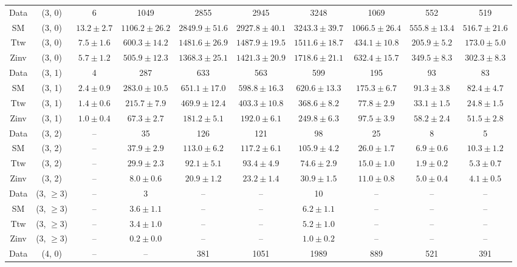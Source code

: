 \begin{table}[h!]
{\begin{tabular}{cccccccccc}
	Data & (3, 0) & 6 & 1049 & 2855 & 2945 & 3248 & 1069 & 552 & 519 \\[0.5ex] 
	SM & (3, 0) & $13.2\pm 2.7$ & $1106.2\pm 26.2$ & $2849.9\pm 51.6$ & $2927.8\pm 40.1$ & $3243.3\pm 39.7$ & $1066.5\pm 26.4$ & $555.8\pm 13.4$ & $516.7\pm 21.6$ \\[0.5ex] 
	Ttw & (3, 0) & $7.5\pm 1.6$ & $600.3\pm 14.2$ & $1481.6\pm 26.9$ & $1487.9\pm 19.5$ & $1511.6\pm 18.7$ & $434.1\pm 10.8$ & $205.9\pm 5.2$ & $173.0\pm 5.0$ \\[0.5ex] 
	Zinv & (3, 0) & $5.7\pm 1.2$ & $505.9\pm 12.3$ & $1368.3\pm 25.1$ & $1421.3\pm 20.9$ & $1718.6\pm 21.1$ & $632.4\pm 15.7$ & $349.5\pm 8.3$ & $302.3\pm 8.3$ \\[0.5ex] 
	Data & (3, 1) & 4 & 287 & 633 & 563 & 599 & 195 & 93 & 83 \\[0.5ex] 
	SM & (3, 1) & $2.4\pm 0.9$ & $283.0\pm 10.5$ & $651.1\pm 17.0$ & $598.8\pm 16.3$ & $620.6\pm 13.3$ & $175.3\pm 6.7$ & $91.3\pm 3.8$ & $82.4\pm 4.7$ \\[0.5ex] 
	Ttw & (3, 1) & $1.4\pm 0.6$ & $215.7\pm 7.9$ & $469.9\pm 12.4$ & $403.3\pm 10.8$ & $368.6\pm 8.2$ & $77.8\pm 2.9$ & $33.1\pm 1.5$ & $24.8\pm 1.5$ \\[0.5ex] 
	Zinv & (3, 1) & $1.0\pm 0.4$ & $67.3\pm 2.7$ & $181.2\pm 5.1$ & $192.0\pm 6.1$ & $249.8\pm 6.3$ & $97.5\pm 3.9$ & $58.2\pm 2.4$ & $51.5\pm 2.8$ \\[0.5ex] 
	Data & (3, 2) & -- & 35 & 126 & 121 & 98 & 25 & 8 & 5 \\[0.5ex] 
	SM & (3, 2) & -- & $37.9\pm 2.9$ & $113.0\pm 6.2$ & $117.2\pm 6.1$ & $105.9\pm 4.2$ & $26.0\pm 1.7$ & $6.9\pm 0.6$ & $10.3\pm 1.2$ \\[0.5ex] 
	Ttw & (3, 2) & -- & $29.9\pm 2.3$ & $92.1\pm 5.1$ & $93.4\pm 4.9$ & $74.6\pm 2.9$ & $15.0\pm 1.0$ & $1.9\pm 0.2$ & $5.3\pm 0.7$ \\[0.5ex] 
	Zinv & (3, 2) & -- & $8.0\pm 0.6$ & $20.9\pm 1.2$ & $23.2\pm 1.4$ & $30.9\pm 1.5$ & $11.0\pm 0.8$ & $5.0\pm 0.4$ & $4.1\pm 0.5$ \\[0.5ex] 
	Data & (3, $\ge3$) & -- & 3 & -- & -- & 10 & -- & -- & -- \\[0.5ex] 
	SM & (3, $\ge3$) & -- & $3.6\pm 1.1$ & -- & -- & $6.2\pm 1.1$ & -- & -- & -- \\[0.5ex] 
	Ttw & (3, $\ge3$) & -- & $3.4\pm 1.0$ & -- & -- & $5.2\pm 1.0$ & -- & -- & -- \\[0.5ex] 
	Zinv & (3, $\ge3$) & -- & $0.2\pm 0.0$ & -- & -- & $1.0\pm 0.2$ & -- & -- & -- \\[0.5ex] 
	Data & (4, 0) & -- & -- & 381 & 1051 & 1989 & 889 & 521 & 391 \\[0.5ex] 

\end{tabular}}
\end{table}
